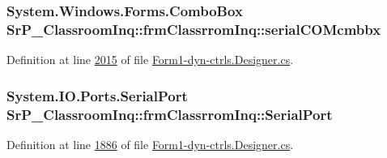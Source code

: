 \hypertarget{class_sr_p___classroom_inq_1_1frm_classrrom_inq_a78530d93c34ef9033ba7bd57c265782a}{
\subsubsection[{serial\-C\-O\-Mcmbbx}]{\setlength{\rightskip}{0pt plus 5cm}\-System.\-Windows.\-Forms.\-Combo\-Box {\bf \-Sr\-P\-\_\-\-Classroom\-Inq\-::frm\-Classrrom\-Inq\-::serial\-C\-O\-Mcmbbx}}}
\label{class_sr_p___classroom_inq_1_1frm_classrrom_inq_a78530d93c34ef9033ba7bd57c265782a}


\-Definition at line \hyperlink{_form1-dyn-ctrls_8_designer_8cs_source_l02015}{2015} of file \hyperlink{_form1-dyn-ctrls_8_designer_8cs_source}{\-Form1-\/dyn-\/ctrls.\-Designer.\-cs}.

\hypertarget{class_sr_p___classroom_inq_1_1frm_classrrom_inq_ae7bb088b1faefea06978daccf238ecd0}{
\subsubsection[{\-Serial\-Port}]{\setlength{\rightskip}{0pt plus 5cm}\-System.\-I\-O.\-Ports.\-Serial\-Port {\bf \-Sr\-P\-\_\-\-Classroom\-Inq\-::frm\-Classrrom\-Inq\-::\-Serial\-Port}}}
\label{class_sr_p___classroom_inq_1_1frm_classrrom_inq_ae7bb088b1faefea06978daccf238ecd0}


\-Definition at line \hyperlink{_form1-dyn-ctrls_8_designer_8cs_source_l01886}{1886} of file \hyperlink{_form1-dyn-ctrls_8_designer_8cs_source}{\-Form1-\/dyn-\/ctrls.\-Designer.\-cs}.

